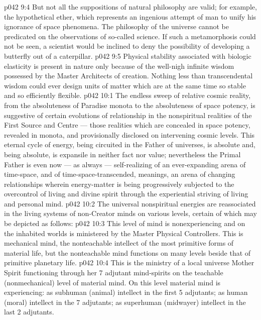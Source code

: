\vs p042 9:4 But not all the suppositions of natural philosophy are valid; for example, the hypothetical ether, which represents an ingenious attempt of man to unify his ignorance of space phenomena. The philosophy of the universe cannot be predicated on the observations of so\hyp{}called science. If such a metamorphosis could not be seen, a scientist would be inclined to deny the possibility of developing a butterfly out of a caterpillar.
\vs p042 9:5 Physical stability associated with biologic elasticity is present in nature only because of the well\hyp{}nigh infinite wisdom possessed by the Master Architects of creation. Nothing less than transcendental wisdom could ever design units of matter which are at the same time so stable and so efficiently flexible.
\vs p042 10:1 The endless sweep of relative cosmic reality, from the absoluteness of Paradise monota to the absoluteness of space potency, is suggestive of certain evolutions of relationship in the nonspiritual realities of the First Source and Centre --- those realities which are concealed in space potency, revealed in monota, and provisionally disclosed on intervening cosmic levels. This eternal cycle of energy, being circuited in the Father of universes, is absolute and, being absolute, is expansile in neither fact nor value; nevertheless the Primal Father is even now --- as always --- self\hyp{}realizing of an ever\hyp{}expanding arena of time\hyp{}space, and of time\hyp{}space\hyp{}transcended, meanings, an arena of changing relationships wherein energy\hyp{}matter is being progressively subjected to the overcontrol of living and divine spirit through the experiential striving of living and personal mind.
\vs p042 10:2 The universal nonspiritual energies are reassociated in the living systems of non\hyp{}Creator minds on various levels, certain of which may be depicted as follows:
\vs p042 10:3 \bibnobreakspace {} This level of mind is nonexperiencing and on the inhabited worlds is ministered by the Master Physical Controllers. This is mechanical mind, the nonteachable intellect of the most primitive forms of material life, but the nonteachable mind functions on many levels beside that of primitive planetary life.
\vs p042 10:4 \bibnobreakspace {} This is the ministry of a local universe Mother Spirit functioning through her 7 adjutant mind\hyp{}spirits on the teachable (nonmechanical) level of material mind. On this level material mind is experiencing: as subhuman (animal) intellect in the first 5 adjutants; as human (moral) intellect in the 7 adjutants; as superhuman (midwayer) intellect in the last 2 adjutants.
